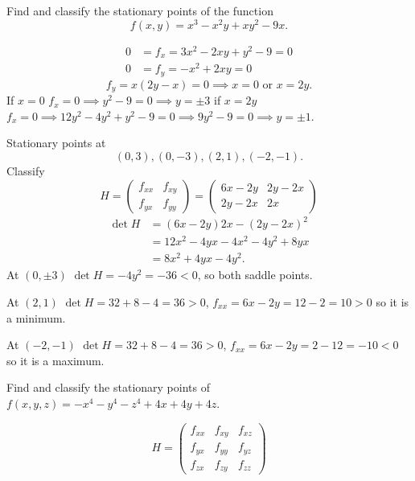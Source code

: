 \documentclass[10pt, a4paper]{article}
\begin{document}
\begin{problem}
    Find and classify the stationary points of the function
    \[
    f(x, y) = x ^ 3 - x ^ 2y + xy ^ 2 - 9x.
    \]

    \begin{solution}
        \begin{align*}
            0 &= f_x = 3x ^ 2 - 2xy + y ^ 2 - 9 = 0 \\
            0 &= f_y = -x ^ 2 + 2xy = 0
        \end{align*}
        \[
        f_y = x(2y - x) = 0 \implies x = 0\text{ or } x = 2y.
        \]
        If $x = 0$ $f_x = 0 \implies y ^ 2 - 9 = 0 \implies y = \pm 3$
        if $x = 2y$ $f_x = 0 \implies 12y ^ 2 - 4y ^ 2 + y ^ 2 - 9 = 0 \implies 9y ^ 2 - 9 = 0 \implies y = \pm 1$.

        Stationary points at
        \[
        (0, 3), (0, -3), (2, 1), (-2, -1).
        \]
        Classify
        \[
        H = \begin{pmatrix}
            f_{xx} & f_{xy} \\
            f_{yx} & f_{yy}
        \end{pmatrix} = \begin{pmatrix}
            6x - 2y & 2y - 2x \\
            2y - 2x & 2x
        \end{pmatrix}
        \]
        \begin{align*}
            \det{H} &= (6x - 2y)2x - (2y - 2x) ^ 2 \\
            &= 12x ^ 2 - 4yx - 4x ^ 2 - 4y ^ 2 + 8yx \\
            &= 8x ^ 2 + 4yx - 4y ^ 2.
        \end{align*}
        At $(0, \pm 3)$ $\det{H} = -4y ^ 2 = -36 < 0$,
        so both saddle points.

        At $(2, 1)$ $\det{H} = 32 + 8 - 4 = 36 > 0$,
        $f_{xx} = 6x - 2y = 12 - 2 = 10 > 0$ so it is a minimum.
        
        At $(-2, -1)$ $\det{H} = 32 + 8 - 4 = 36 > 0$,
        $f_{xx} = 6x - 2y = 2 - 12 = -10 < 0$ so it is a maximum.
    \end{solution}
\end{problem}

\begin{problem}
    Find and classify the stationary points of $f(x, y, z) = -x ^ 4 - y ^ 4 - z ^ 4 + 4x + 4y + 4z$.

    \begin{solution}
        \[
        H = \begin{pmatrix}
            f_{xx} & f_{xy} & f_{xz} \\
            f_{yx} & f_{yy} & f_{yz} \\
            f_{zx} & f_{zy} & f_{zz}
        \end{pmatrix}
        \]
    \end{solution}
\end{problem}
\end{document}
